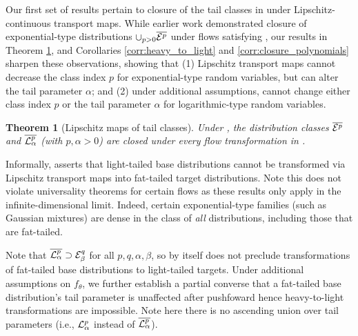\documentclass[twoside]{article}
\newtheorem{theorem}{Theorem}
\theoremstyle{definition}
\theoremstyle{remark}
\begin{document}
\vspace{-1mm}
Our first set of results pertain to closure of the tail classes in 
under Lipschitz-continuous transport maps. While earlier work \citep{jaini2020tails} demonstrated
closure of exponential-type distributions $\cup_{p > 0} \overline{\mathcal{E}^p}$ under flows satisfying , our results in Theorem \ref{thm:distn_class_closed}, and Corollaries \ref{corr:heavy_to_light} and \ref{corr:closure_polynomials} sharpen these observations, showing that (1) Lipschitz transport maps cannot decrease the class index $p$ for exponential-type random variables, but can alter the tail parameter $\alpha$; and
(2) under additional assumptions, cannot change either class index $p$ or the tail parameter $\alpha$ for logarithmic-type random variables.

\begin{theorem}[Lipschitz maps of tail classes]
  \label{thm:distn_class_closed}
  Under ,
  the distribution classes $\overline{\mathcal{E}^p}$
  and $\overline{\mathcal{L}^p_\alpha}$ (with $p,\alpha > 0$) are closed
  under every flow transformation in .
\end{theorem}

Informally,  asserts that light-tailed base distributions cannot be transformed
via Lipschitz transport maps into fat-tailed target distributions.
Note this does not violate universality theorems for certain flows \citep{huang2018neural}
as these results only apply in the infinite-dimensional limit. Indeed, certain exponential-type families (such as Gaussian mixtures) are dense in the class of \emph{all} distributions, including those that are fat-tailed.

Note that $\overline{\mathcal{L}^p_\alpha} \supset \mathcal{E}^q_\beta$ for all $p,q,\alpha,\beta$, so 
by itself does not preclude transformations of fat-tailed base distributions to light-tailed targets.
Under additional assumptions on $f_\theta$, we further establish a partial converse that a fat-tailed base distribution's tail parameter is unaffected after pushfoward
hence heavy-to-light transformations are impossible. Note here there is no ascending union over
tail parameters (i.e., $\mathcal{L}^p_\alpha$ instead of $\overline{\mathcal{L}^p_\alpha}$).
\end{document}
